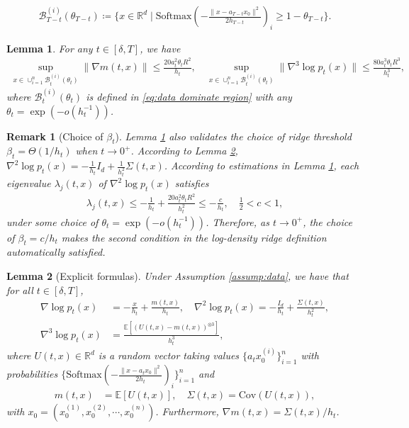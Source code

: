\documentclass[10pt,a4paper]{amsart}
\newtheorem{remark}{Remark}
\newtheorem{lemma}{Lemma}
\newcommand{\Softmax}{\mathrm{Softmax}}
\newcommand{\mb}{\mathbb}
\newcommand{\mc}{\mathcal}
\begin{document}
\begin{align}\label{eq:data dominate region}
    \mc{B}_{T-t}^{(i)}(\theta_{T-t}) \coloneqq \{ x\in \mb{R}^d \mid \Softmax(-\frac{\| x-a_{T-t}x_0 \|^2}{2h_{T-t}})_i \ge 1-\theta_{T-t} \}.
\end{align}

\begin{lemma}\label{lem:important estimate} For any $t\in [\delta,T]$, we have
\begin{align*}
    \sup_{x\in \cup_{i=1}^n \mc{B}_{t}^{(i)}(\theta_{t})} \| \nabla m(t,x) \|\le \frac{20a_t^2 \theta_t R^2}{h_t},\quad  \sup_{x\in \cup_{i=1}^n \mc{B}_{t}^{(i)}(\theta_{t})}\| \nabla^3 \log p_t(x) \|\le \frac{80 a_t^3\theta_t R^3}{h_t^{3}},
\end{align*} 
where $\mc{B}_{t}^{(i)}(\theta_{t})$ is defined in \eqref{eq:data dominate region} with any $\theta_t=\exp(- o(h_{t}^{-1}) )$.
\end{lemma}

\begin{remark}[Choice of $\beta_t$]\label{rem:choice of beta} Lemma \ref{lem:important estimate} also validates the choice of ridge threshold $\beta_t=\Theta(1/h_t)$ when $t\to 0^+$. According to Lemma \ref{lem:explicit formula}, $\nabla^2\log p_t(x) = -\tfrac{1}{h_t}I_d + \tfrac{1}{h_t^2}\Sigma(t,x)$. According to estimations in Lemma \ref{lem:important estimate}, each eigenvalue $\lambda_j(t,x)$ of $\nabla^2\log p_t(x)$ satisfies
\begin{align*}
    \lambda_j(t,x) \le -\frac{1}{h_t} + \frac{20a_t^2 \theta_t R^2 }{h_t^2} \le -\frac{c}{h_t}, \quad \frac{1}{2}<c<1,
\end{align*}
under some choice of $\theta_t=\exp(- o(h_{t}^{-1}) )$. Therefore, as $t\to 0^+$, the choice of $\beta_t=c/h_t$ makes the second condition in the log-density ridge definition automatically satisfied.    
\end{remark}

\begin{lemma}[Explicit formulas]\label{lem:explicit formula} Under Assumption \ref{assump:data}, we have that for all $t\in [\delta,T]$,
    \begin{align*}
        \nabla \log p_t(x) &= -\frac{x}{h_t}+\frac{m(t,x)}{h_t}, \quad \nabla^2 \log p_t(x) = -\frac{I_d}{h_t}+\frac{\Sigma(t,x)}{h_t^2},\\
        \nabla^3\log p_t(x) &= \frac{\mb{E}[(U(t,x)-m(t,x))^{\otimes 3}]}{h_t^3},
    \end{align*}
    where $U(t,x)\in \mb{R}^d$ is a random vector taking values $\{a_tx_0^{(i)}\}_{i=1}^n$ with probabilities $\{\Softmax( -\frac{\| x-a_t x_0 \|^2}{2h_t} )_i\}_{i=1}^n$ and 
    \begin{align*}
        m(t,x) &= \mb{E}[U(t,x)], \quad
        \Sigma(t,x)  =\mathrm{Cov}(U(t,x)),
    \end{align*}
    with $x_0=(x_0^{(1)}, x_0^{(2)},\cdots, x_0^{(n)})$. Furthermore, $\nabla m(t,x)= \Sigma(t,x)/h_t$.
\end{lemma}
\end{document}
